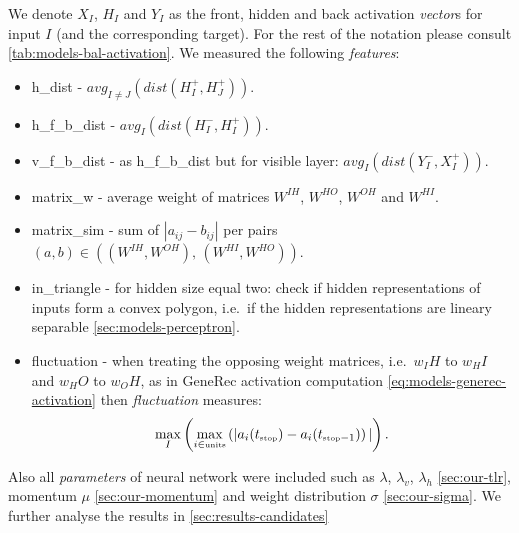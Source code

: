 We denote $X_I$, $H_I$ and $Y_I$ as the front, hidden and back activation \emph{vector}s for input $I$ (and the corresponding target). For the rest of the notation please consult \ref{tab:models-bal-activation}. We measured the following \emph{features}: 
\begin{itemize} 
\item h\_dist - $avg_{I \neq J}\left(dist(H_I^{+},H_J^{+})\right)$.
\item h\_f\_b\_dist - $avg_{I}\left(dist(H_I^{-},H_I^{+})\right)$.
\item	v\_f\_b\_dist - as h\_f\_b\_dist but for visible layer: $avg_{I}\left(dist(Y_I^{-},X_I^{+})\right)$. 
\item matrix\_w - average weight of matrices $W^{IH}$, $W^{HO}$, $W^{OH}$ and $W^{HI}$. 
\item matrix\_sim - sum of $|a_{ij} - b_{ij}|$ per pairs $(a,b) \in ((W^{IH}, W^{OH}),\, (W^{HI}, W^{HO}))$. 
\item \label{sec:our-in-triangle} in\_triangle - for hidden size equal two: check if hidden representations of inputs form a convex polygon, i.e.~if the hidden representations are lineary separable \ref{sec:models-perceptron}. 
\item fluctuation - when treating the opposing weight matrices, i.e.~$w_IH$ to $w_HI$ and $w_HO$ to $w_OH$, as in GeneRec activation computation \ref{eq:models-generec-activation} then \emph{fluctuation} measures:
\begin{equation}
  \label{eq:our-fluctuation}
  \max_{I}\left(
    \max_{i \in \mbox{\tiny units}}\left(
      |a_i(t_{\mbox{\tiny stop}}) - a_i(t_{\mbox{\tiny stop}-1})
    \right)|
  \right). 
\end{equation}



\end{itemize} 

Also all \emph{parameters} of neural network were included such as $\lambda$, $\lambda_v$, $\lambda_h$ \ref{sec:our-tlr}, momentum $\mu$ \ref{sec:our-momentum} and weight distribution $\sigma$ \ref{sec:our-sigma}. We further analyse the results in \ref{sec:results-candidates} 
